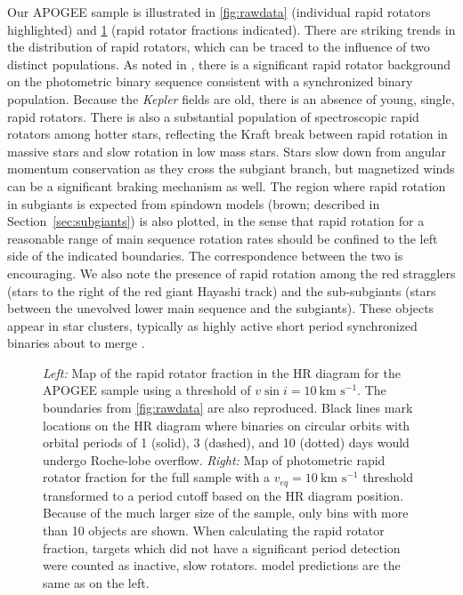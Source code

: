 \documentclass[preprint2]{aastex62}
\newcommand{\vsini}{\ensuremath{v \sin i}}
\newcommand{\Kepler}{\mbox{\textit{Kepler}}}
\newcommand{\kms}{\textrm{km~s}\ensuremath{^{-1}}}
\begin{document}
Our APOGEE sample is illustrated in \cref{fig:rawdata} (individual rapid
rotators highlighted) and \cref{fig:rapidmaps} (rapid rotator fractions
indicated). There are striking trends in the distribution of rapid rotators,
which can be traced to the influence of two distinct populations.
As noted in \citet{Simonian19}, there is a significant rapid rotator background
on the photometric binary sequence consistent with a synchronized binary 
population. Because the \Kepler{} fields are old, there is an absence of young,
single, rapid rotators. There is also a substantial 
population of spectroscopic rapid rotators among hotter stars, reflecting the
Kraft break between rapid rotation in massive stars and slow rotation in low
mass stars. Stars slow down from angular momentum conservation as they cross
the subgiant branch, but magnetized winds can be a significant braking
mechanism as well. The region 
where rapid rotation in subgiants is expected from spindown models (brown; 
described in Section~\ref{sec:subgiants}) is also plotted, in the sense that 
rapid rotation for a reasonable range of main sequence rotation rates should be
confined to the left side of the indicated boundaries. The correspondence
between the two is encouraging. We also note the presence of rapid rotation 
among the red stragglers (stars to the right of the red giant Hayashi track)
and the sub-subgiants (stars between the unevolved lower main sequence and the
subgiants).
These objects appear in star clusters, typically as highly active short period
synchronized binaries about to merge \citep{Geller17,Leiner17}.

\begin{figure}[htb]
    \centering
    \caption{\emph{Left:} Map of the rapid rotator fraction in the HR diagram
        for the APOGEE sample using a threshold of \(\vsini = 10~\kms\).
        The boundaries from \cref{fig:rawdata} are also reproduced. Black 
        lines mark locations on the HR diagram where binaries on circular 
        orbits with orbital periods of 1 (solid), 3 (dashed), and 10 (dotted) 
        days would undergo Roche-lobe overflow. \emph{Right:} Map of 
        photometric rapid rotator fraction for the full \citet{McQuillan14} 
        sample with a \(v_{eq} = 10~\kms\) threshold transformed to a period
        cutoff based on the HR diagram position. Because of the much larger 
        size of the \citet{McQuillan14} sample, only bins 
        with more than 10 objects are shown. When calculating the rapid rotator 
        fraction, targets which did not have a significant period detection 
    were counted as inactive, slow rotators.  \citet{vanSaders13} model
predictions are the same as on the left.}
    \label{fig:rapidmaps}
\end{figure}
\end{document}
